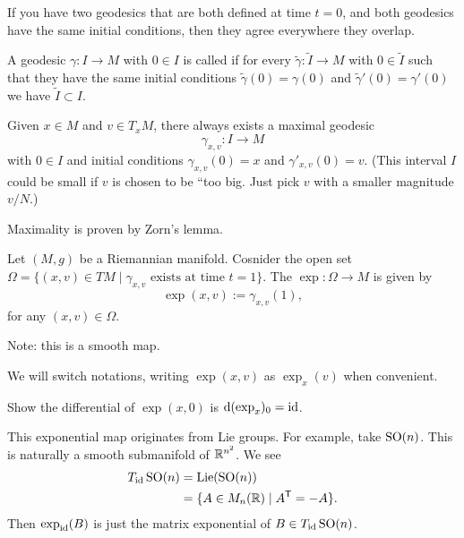 \begin{remark}
If you have two geodesics that are both defined at time $t=0$, and
both geodesics have the same initial conditions, then they agree
everywhere they overlap.
\end{remark}

\begin{definition}
A geodesic $\gamma\colon I\to M$ with $0\in I$ is called
 if for every
$\widetilde{\gamma}\colon\widetilde{I}\to M$ with $0\in\widetilde{I}$
such that they have the same initial conditions
$\widetilde{\gamma}(0)=\gamma(0)$ and $\widetilde{\gamma}'(0)=\gamma'(0)$
we have $\widetilde{I}\subset I$.
\end{definition}

\begin{remark}
Given $x\in M$ and $v\in T_{x}M$, there always exists a maximal
geodesic
\begin{equation}
\gamma_{x,v}\colon I\to M
\end{equation}
with $0\in I$ and initial conditions $\gamma_{x,v}(0)=x$ and
$\gamma'_{x,v}(0)=v$. (This interval $I$ could be small if $v$ is
chosen to be ``too big. Just pick $v$ with a smaller magnitude $v/N$.)
\end{remark}

\begin{remark}
Maximality is proven by Zorn's lemma.
\end{remark}

\begin{definition}
Let $(M,g)$ be a Riemannian manifold. Cosnider the open set
$\Omega=\{(x,v)\in TM\mid \gamma_{x,v}\mbox{ exists at time }t=1\}$.
The  $\exp\colon\Omega\to M$ is given by
\begin{equation}
\exp(x,v):=\gamma_{x,v}(1),
\end{equation}
for any $(x,v)\in\Omega$.

Note: this is a smooth map.
\end{definition}

\begin{notation}
We will switch notations, writing $\exp(x,v)$ as $\exp_{x}(v)$ when convenient.
\end{notation}

\begin{xca}
Show the differential of $\exp(x,0)$ is $\mathrm{d}(\exp_{x})_{0}=\operatorname{id}$.
\end{xca}

\begin{remark}
This exponential map originates from Lie groups. For example, take
$\operatorname{SO}(n)$. This is naturally a smooth submanifold of
$\mathbb{R}^{n^{2}}$. We see
\begin{equation}
\begin{split}
T_{\operatorname{id}}\operatorname{SO}(n) &= \operatorname{Lie}(\operatorname{SO}(n))\\
&=\{A\in M_{n}(\mathbb{R})\mid A^{\mathsf{T}}=-A\}.
\end{split}
\end{equation}
Then $\exp_{\operatorname{id}}(B)$ is just the matrix exponential of $B\in T_{\operatorname{id}}\operatorname{SO}(n)$.
\end{remark}
